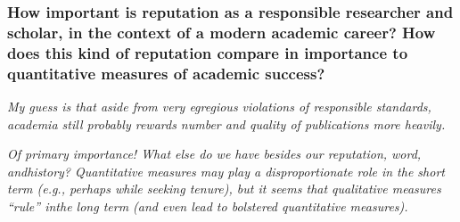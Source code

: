 \documentclass{beamer}
\begin{document}
\begin{frame}

\frametitle{How important is reputation as a responsible researcher and scholar, in the context of a modern academic career? How does this kind of reputation compare in importance to quantitative measures of academic success?}


\medskip

{\it   My guess is that aside from very egregious violations of responsible standards, academia still probably rewards number and quality of publications more heavily.}

\medskip

{\it Of  primary  importance!   What  else  do  we  have  besides  our  reputation,  word,  andhistory?   Quantitative  measures  may  play  a  disproportionate  role  in  the  short  term (e.g., perhaps while seeking tenure), but it seems that qualitative measures “rule” inthe long term (and even lead to bolstered quantitative measures).}












\end{frame}
\end{document}
